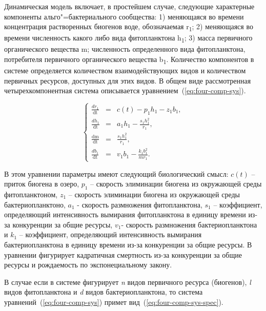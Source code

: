 \documentclass[a4paper,12pt,openany,final]{extreport}
\begin{document}
Динамическая модель включает, в простейшем случае, следующие характерные компоненты альго"=бактериального сообщества: 1) меняющаяся во времени концентрация растворенных биогенов воде, обозначаемая r\textsubscript{1}; 2) меняющаяся во времени численность какого либо вида фитопланктона h\textsubscript{1}; 3) масса первичного органического вещества m; численность определенного вида фитопланктона, потребителя первичного органического вещества b\textsubscript{1}. Количество компонентов в системе определяется количеством взаимодействующих видов и количеством первичных ресурсов, доступных для этих видов. В общем виде рассмотренная четырехкомпонентная система описывается уравнением~(\ref{eq:four-comp-sys}).

\begin{equation}
\left\{ \begin{array}{lcl}
\frac{dr_{1}}{\text{dt}} &=& c\left( t \right) - p_{1}h_{1} - z_{1}b_{1},\\
\frac{dh_{1}}{\text{dt}} &=& a_{1}h_{1} - \frac{s_{1}h_{1}^{2}}{r_{1}},\\
\frac{\text{dm}}{\text{dt}} &=& \frac{s_{1}h_{1}^{2}}{r_{1}},\\
\frac{db_{1}}{\text{dt}} &=& v_{1}b_{1} - \frac{k_{1}b_{1}^{2}}{mr_{1}}.
\end{array} \right. \label{eq:four-comp-sys}
\end{equation}

В этом уравнении параметры имеют следующий биологический смысл: \(c(t)\) --
приток биогена в озеро, \(p_{1}\) -- скорость элиминации биогена из
окружающей среды фитопланктоном, \(z_{1}\) -- скорость элиминации
биогена из окружающей среды бактериопланктоно, \(a_{1}\) - скорость
размножения фитопланктона, \(s_{1}\) -- коэффициент, определяющий
интенсивность вымирания фитопланктона в единицу времени из-за
конкуренции за общие ресурсы, \(v_1\)- скорость размножения бактериопланктона и
\(k_{1}\) -- коэффициент, определяющий интенсивность вымирания
бактериопланктона в единицу времени из-за конкуренции за общие ресурсы.
В уравнении фигурирует кадратичная смертность из-за конкуренции за общие
ресурсы и рождаемость по экспонециальному закону.

В случае если в системе фигурирует \emph{n} видов первичного ресурса
(биогенов), \emph{l} видов фитопланктона и \emph{d} видов
бактериопланктона, то система уравнений~(\ref{eq:four-comp-sys}) примет вид~(\ref{eq:four-comp-sys-spec}).
\end{document}

